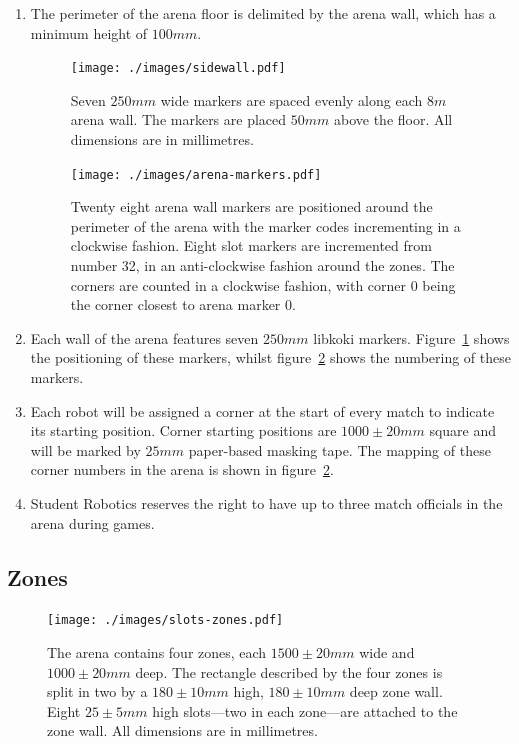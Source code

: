 \begin{enumerate}
\item The perimeter of the arena floor is delimited by the arena wall, which has a minimum height of $100mm$.

\begin{figure}
  \centering
  \texttt{[image: ./images/sidewall.pdf]}
  \caption{Seven $250mm$ wide markers are spaced evenly along each $8m$ arena wall.
           The markers are placed $50mm$ above the floor.
	   All dimensions are in millimetres.}
  \label{fig:arena-wall}
\end{figure}

\begin{figure}
  \centering
  \texttt{[image: ./images/arena-markers.pdf]}
  \caption{Twenty eight arena wall markers are positioned around the perimeter of the arena with the marker codes incrementing in a clockwise fashion.
           Eight slot markers are incremented from number 32, in an anti-clockwise fashion around the zones.
           The corners are counted in a clockwise fashion, with corner 0 being the corner closest to arena marker 0.}
  \label{fig:arena-zones}
\end{figure}

\item Each wall of the arena features seven $250mm$ libkoki markers.
      Figure~\ref{fig:arena-wall} shows the positioning of these markers, whilst figure~\ref{fig:arena-zones} shows the numbering of these markers.

\item Each robot will be assigned a corner at the start of every match to indicate its starting position.
      Corner starting positions are $1000 \pm 20mm$ square and will be marked by $25mm$ paper-based masking tape.
      The mapping of these corner numbers in the arena is shown in figure~\ref{fig:arena-zones}.

\item Student Robotics reserves the right to have up to three match officials in the arena during games.

\end{enumerate}


\subsection{Zones}
\label{sub:Zones}

\begin{figure}
  \centering
  \texttt{[image: ./images/slots-zones.pdf]}
  \caption{The arena contains four zones, each $1500 \pm 20mm$ wide and $1000 \pm 20mm$ deep.
           The rectangle described by the four zones is split in two by a $180 \pm 10mm$ high, $180 \pm 10mm$ deep zone wall.
           Eight $25 \pm 5mm$ high slots---two in each zone---are attached to the zone wall.
           All dimensions are in millimetres.}
  \label{fig:slots-zones}
\end{figure}

